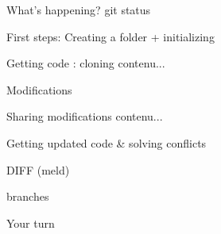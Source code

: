 \documentclass{beamer}
\begin{document}
	\begin{frame}{What's happening?}
		git status
	\end{frame}
	\begin{frame}{First steps: Creating a folder + initializing}
		
	\end{frame}
	\begin{frame}{Getting code : cloning}
		contenu...
	\end{frame}
	\begin{frame}{Modifications}
		
	\end{frame}
	\begin{frame}{Sharing modifications}
		contenu...
	\end{frame}
	\begin{frame}{Getting updated code \& solving conflicts}
	
	\end{frame}
	\begin{frame}
		DIFF (meld)
	\end{frame}
	\begin{frame}
		branches
	\end{frame}
	\begin{frame}
		Your turn
	\end{frame}	
\end{document}
